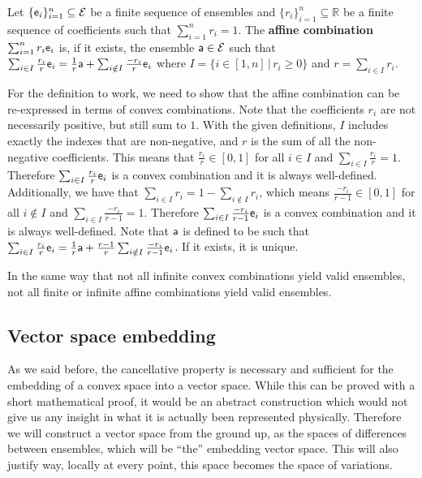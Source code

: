 \begin{mathSection}	
\begin{defn}
	Let $\{\ens_i\}_{i=1}^n \subseteq \Ens$ be a finite sequence of ensembles and $\{r_i\}_{i=1}^n \subseteq \mathbb{R}$ be a finite sequence of coefficients such that $\sum_{i=1}^n r_i = 1$. The \textbf{affine combination} $\sum_{i=1}^n r_i \ens_i$ is, if it exists, the ensemble $\ens[a] \in \Ens$ such that  $\sum_{i \in I} \frac{r_i}{r} \ens_i = \frac{1}{r} \ens[a] + \sum_{i \notin I} \frac{-r_i}{r} \ens_i$ where $I = \{ i \in [1,n] \, | \, r_i \geq 0 \}$ and $r = \sum_{i \in I} r_i$.
\end{defn}

\begin{check}
	For the definition to work, we need to show that the affine combination can be re-expressed in terms of convex combinations. Note that the coefficients $r_i$ are not necessarily positive, but still sum to $1$. With the given definitions, $I$ includes exactly the indexes that are non-negative, and $r$ is the sum of all the non-negative coefficients. This means that $\frac{r_i}{r} \in [0,1]$ for all $i \in I$ and $\sum_{i \in I} \frac{r_i}{r}=1$. Therefore $\sum_{i \in I} \frac{r_i}{r} \ens_i$ is a convex combination and it is always well-defined. Additionally, we have that $\sum_{i \in I} r_i = 1 - \sum_{i \notin I} r_i$, which means $\frac{-r_i}{r - 1} \in [0,1]$ for all $i \notin I$ and $\sum_{i \in I} \frac{-r_i}{r-1}=1$. Therefore $\sum_{i \in I} \frac{-r_i}{r-1} \ens_i$ is a convex combination and it is always well-defined. Note that $\ens[a]$ is defined to be such that $\sum_{i \in I} \frac{r_i}{r} \ens_i = \frac{1}{r} \ens[a] + \frac{r-1}{r}\sum_{i \notin I} \frac{-r_i}{r-1} \ens_i$. If it exists, it is unique.
\end{check}	

\begin{remark}
	In the same way that not all infinite convex combinations yield valid ensembles, not all finite or infinite affine combinations yield valid ensembles.
\end{remark}
\end{mathSection}

\subsection{Vector space embedding}

As we said before, the cancellative property is necessary and sufficient for the embedding of a convex space into a vector space. While this can be proved with a short mathematical proof, it would be an abstract construction which would not give us any insight in what it is actually been represented physically. Therefore we will construct a vector space from the ground up, as the spaces of differences between ensembles, which will be ``the'' embedding vector space. This will also justify way, locally at every point, this space becomes the space of variations.


